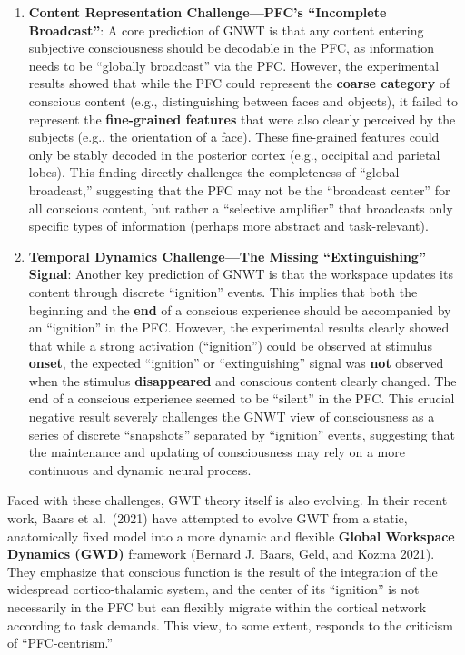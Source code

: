 \documentclass[
  a4paper]{article}
\begin{document}
\begin{enumerate}
\def\labelenumi{\arabic{enumi}.}
\item
  \textbf{Content Representation Challenge---PFC's ``Incomplete
  Broadcast''}: A core prediction of GNWT is that any content entering
  subjective consciousness should be decodable in the PFC, as
  information needs to be ``globally broadcast'' via the PFC. However,
  the experimental results showed that while the PFC could represent the
  \textbf{coarse category} of conscious content (e.g., distinguishing
  between faces and objects), it failed to represent the
  \textbf{fine-grained features} that were also clearly perceived by the
  subjects (e.g., the orientation of a face). These fine-grained
  features could only be stably decoded in the posterior cortex (e.g.,
  occipital and parietal lobes). This finding directly challenges the
  completeness of ``global broadcast,'' suggesting that the PFC may not
  be the ``broadcast center'' for all conscious content, but rather a
  ``selective amplifier'' that broadcasts only specific types of
  information (perhaps more abstract and task-relevant).
\item
  \textbf{Temporal Dynamics Challenge---The Missing ``Extinguishing''
  Signal}: Another key prediction of GNWT is that the workspace updates
  its content through discrete ``ignition'' events. This implies that
  both the beginning and the \textbf{end} of a conscious experience
  should be accompanied by an ``ignition'' in the PFC. However, the
  experimental results clearly showed that while a strong activation
  (``ignition'') could be observed at stimulus \textbf{onset}, the
  expected ``ignition'' or ``extinguishing'' signal was \textbf{not}
  observed when the stimulus \textbf{disappeared} and conscious content
  clearly changed. The end of a conscious experience seemed to be
  ``silent'' in the PFC. This crucial negative result severely
  challenges the GNWT view of consciousness as a series of discrete
  ``snapshots'' separated by ``ignition'' events, suggesting that the
  maintenance and updating of consciousness may rely on a more
  continuous and dynamic neural process.
\end{enumerate}

Faced with these challenges, GWT theory itself is also evolving. In
their recent work, Baars et al.~(2021) have attempted to evolve GWT from
a static, anatomically fixed model into a more dynamic and flexible
\textbf{Global Workspace Dynamics (GWD)} framework (Bernard J. Baars,
Geld, and Kozma 2021). They emphasize that conscious function is the
result of the integration of the widespread cortico-thalamic system, and
the center of its ``ignition'' is not necessarily in the PFC but can
flexibly migrate within the cortical network according to task demands.
This view, to some extent, responds to the criticism of
``PFC-centrism.''
\end{document}
